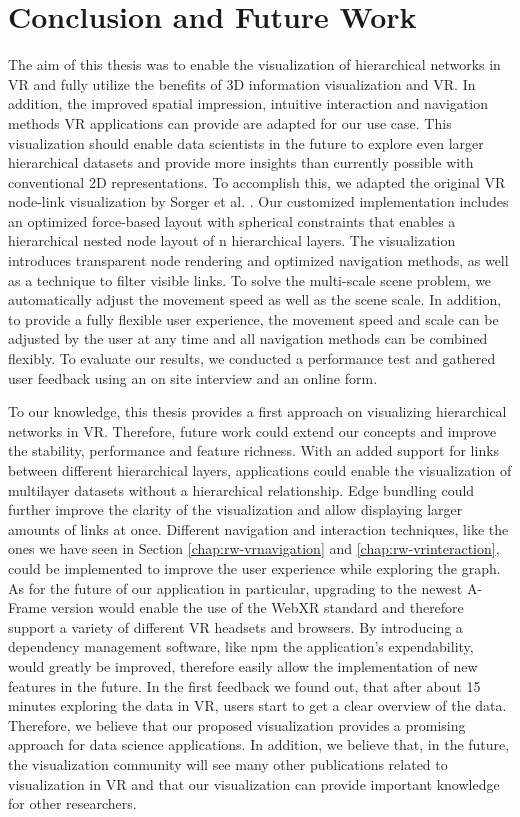 \chapter{Conclusion and Future Work}
\label{chap:conclusion}

The aim of this thesis was to enable the visualization of hierarchical networks in VR and fully utilize the benefits of 3D information visualization and VR. In addition, the improved spatial impression, intuitive interaction and navigation methods VR applications can provide are adapted for our use case. 
This visualization should enable data scientists in the future to explore even larger hierarchical datasets and provide more insights than currently possible with conventional 2D representations.
To accomplish this, we adapted the original VR node-link visualization by Sorger et al. \cite{sorger_immersive_2019}. 
Our customized implementation includes an optimized force-based layout with spherical constraints that enables a hierarchical nested node layout of n hierarchical layers.
The visualization introduces transparent node rendering and optimized navigation methods, as well as a technique to filter visible links. 
To solve the multi-scale scene problem, we automatically adjust the movement speed as well as the scene scale.
In addition, to provide a fully flexible user experience, the movement speed and scale can be adjusted by the user at any time and all navigation methods can be combined flexibly.
To evaluate our results, we conducted a performance test and gathered user feedback using an on site interview and an online form.

To our knowledge, this thesis provides a first approach on visualizing hierarchical networks in VR. Therefore, future work could extend our concepts and improve the stability, performance and feature richness.
With an added support for links between different hierarchical layers, applications could enable the visualization of multilayer datasets without a hierarchical relationship. Edge bundling could further improve the clarity of the visualization and allow displaying larger amounts of links at once. Different navigation and interaction techniques, like the ones we have seen in Section \ref{chap:rw-vrnavigation} and \ref{chap:rw-vrinteraction}, could be implemented to improve the user experience while exploring the graph.
As for the future of our application in particular, upgrading to the newest A-Frame version would enable the use of the WebXR standard and therefore support a variety of different VR headsets and browsers. By introducing a dependency management software, like npm the application's expendability, would greatly be improved, therefore easily allow the implementation of new features in the future.
In the first feedback we found out, that after about 15 minutes exploring the data in VR, users start to get a clear overview of the data. Therefore, we believe that our proposed visualization provides a promising approach for data science applications. In addition, we believe that, in the future, the visualization community will see many other publications related to visualization in VR and that our visualization can provide important knowledge for other researchers.